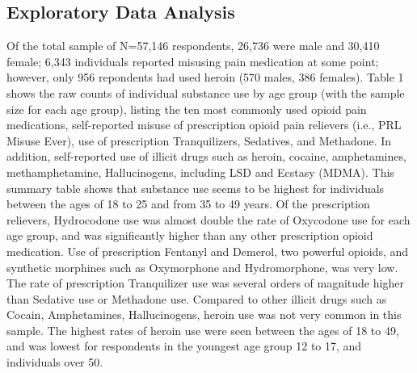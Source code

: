 \documentclass[sigconf]{acmart}
\begin{document}
\subsection{Exploratory Data Analysis}

Of the total sample of N=57,146 respondents, 26,736 were male and 30,410 
female; 6,343 individuals reported misusing pain medication at some point; 
however, only 956 repondents had used heroin (570 males, 386 females). Table 1 
shows the raw counts of individual substance use by age group (with the sample 
size for each age group), listing the ten most commonly used opioid pain 
medications, self-reported misuse of prescription opioid pain relievers (i.e., 
PRL Misuse Ever), use of prescription Tranquilizers, Sedatives, and Methadone. 
In addition, self-reported use of illicit drugs such as heroin, cocaine, 
amphetamines, methamphetamine, Hallucinogens, including LSD and Ecstasy 
(MDMA). This summary table shows that substance use seems to be highest for 
individuals between the ages of 18 to 25 and from 35 to 49 years. Of the
prescription relievers, Hydrocodone use was almost double the rate of 
Oxycodone use for each age group, and was significantly higher than any other 
prescription opioid medication. Use of prescription Fentanyl and Demerol,
two powerful opioids, and synthetic morphines such as Oxymorphone and
Hydromorphone, was very low. The rate of prescription Tranquilizer use
was several orders of magnitude higher than Sedative use or Methadone use.
Compared to other illicit drugs such as Cocain, Amphetamines, Hallucinogens,
heroin use was not very common in this sample. The highest rates of heroin
use were seen between the ages of 18 to 49, and was lowest for respondents
in the youngest age group 12 to 17, and individuals over 50. 
\end{document}
